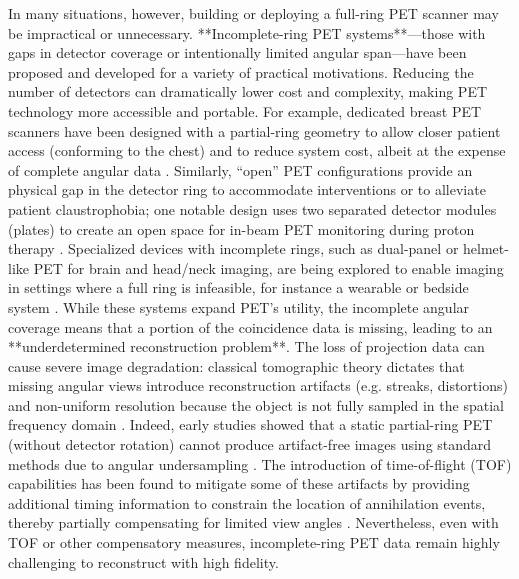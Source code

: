 \documentclass[
reprint,
superscriptaddress,
nofootinbib,
amsmath,amssymb,
aps,
prd,
]{revtex4-2}
\begin{document}
In many situations, however, building or deploying a full-ring PET scanner may be impractical or unnecessary. **Incomplete-ring PET systems**—those with gaps in detector coverage or intentionally limited angular span—have been proposed and developed for a variety of practical motivations. Reducing the number of detectors can dramatically lower cost and complexity, making PET technology more accessible and portable. For example, dedicated breast PET scanners have been designed with a partial-ring geometry to allow closer patient access (conforming to the chest) and to reduce system cost, albeit at the expense of complete angular data \cite{surti2008}. Similarly, “open” PET configurations provide an physical gap in the detector ring to accommodate interventions or to alleviate patient claustrophobia; one notable design uses two separated detector modules (plates) to create an open space for in-beam PET monitoring during proton therapy \cite{tashima2012, krishnamoorthy2021}. Specialized devices with incomplete rings, such as dual-panel or helmet-like PET for brain and head/neck imaging, are being explored to enable imaging in settings where a full ring is infeasible, for instance a wearable or bedside system \cite{zhang2020}. While these systems expand PET’s utility, the incomplete angular coverage means that a portion of the coincidence data is missing, leading to an **underdetermined reconstruction problem**. The loss of projection data can cause severe image degradation: classical tomographic theory dictates that missing angular views introduce reconstruction artifacts (e.g. streaks, distortions) and non-uniform resolution because the object is not fully sampled in the spatial frequency domain \cite{kak1988, surti2008}. Indeed, early studies showed that a static partial-ring PET (without detector rotation) cannot produce artifact-free images using standard methods due to angular undersampling \cite{surti2008}. The introduction of time-of-flight (TOF) capabilities has been found to mitigate some of these artifacts by providing additional timing information to constrain the location of annihilation events, thereby partially compensating for limited view angles \cite{surti2008, krishnamoorthy2021}. Nevertheless, even with TOF or other compensatory measures, incomplete-ring PET data remain highly challenging to reconstruct with high fidelity.
\end{document}
